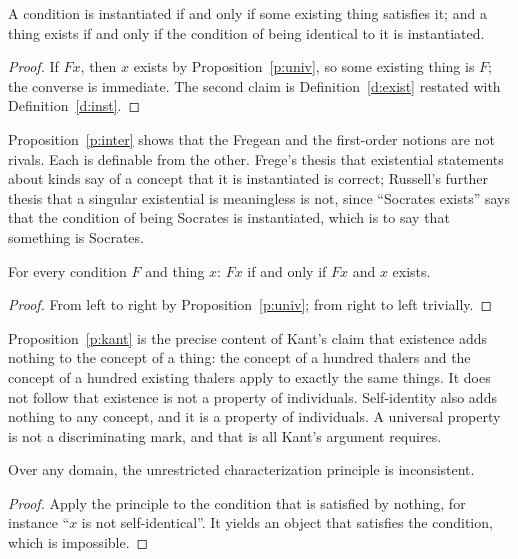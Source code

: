 \documentclass{situationist-preprint}
\begin{document}
\begin{proposition}[Interdefinability]\label{p:inter}
A condition is instantiated if and only if some existing thing satisfies it; and a thing exists if and only if the condition of being identical to it is instantiated.
\end{proposition}

\begin{proof}
If $Fx$, then $x$ exists by Proposition~\ref{p:univ}, so some existing thing is $F$; the converse is immediate. The second claim is Definition~\ref{d:exist} restated with Definition~\ref{d:inst}.
\end{proof}

Proposition~\ref{p:inter} shows that the Fregean and the first-order notions are not rivals. Each is definable from the other. Frege's thesis that existential statements about kinds say of a concept that it is instantiated is correct; Russell's further thesis that a singular existential is meaningless is not, since \enquote{Socrates exists} says that the condition of being Socrates is instantiated, which is to say that something is Socrates.

\begin{proposition}\label{p:kant}
For every condition $F$ and thing $x$: $Fx$ if and only if $Fx$ and $x$ exists.
\end{proposition}

\begin{proof}
From left to right by Proposition~\ref{p:univ}; from right to left trivially.
\end{proof}

Proposition~\ref{p:kant} is the precise content of Kant's claim that existence adds nothing to the concept of a thing: the concept of a hundred thalers and the concept of a hundred existing thalers apply to exactly the same things. It does not follow that existence is not a property of individuals. Self-identity also adds nothing to any concept, and it is a property of individuals. A universal property is not a discriminating mark, and that is all Kant's argument requires.

\begin{theorem}[Russell]\label{t:cp}
Over any domain, the unrestricted characterization principle is inconsistent.
\end{theorem}

\begin{proof}
Apply the principle to the condition that is satisfied by nothing, for instance \enquote{$x$ is not self-identical}. It yields an object that satisfies the condition, which is impossible.
\end{proof}
\end{document}
